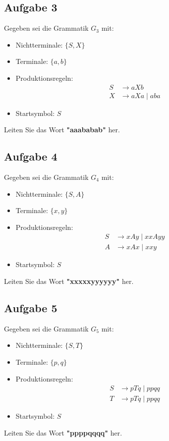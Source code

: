 \documentclass[a4paper,12pt]{article}
\begin{document}
	\subsection*{Aufgabe 3}
	Gegeben sei die Grammatik $G_3$ mit:
	\begin{itemize}
		\item Nichtterminale: $\{S, X\}$
		\item Terminale: $\{a, b\}$
		\item Produktionsregeln:
		\begin{align*}
			S &\rightarrow a X b \\
			X &\rightarrow a X a \mid a b a
		\end{align*}
		\item Startsymbol: $S$
	\end{itemize}
	Leiten Sie das Wort \textbf{"aaababab"} her.
	
	\subsection*{Aufgabe 4}
	Gegeben sei die Grammatik $G_4$ mit:
	\begin{itemize}
		\item Nichtterminale: $\{S, A\}$
		\item Terminale: $\{x, y\}$
		\item Produktionsregeln:
		\begin{align*}
			S &\rightarrow x A y \mid x x A y y \\
			A &\rightarrow x A x \mid x x y
		\end{align*}
		\item Startsymbol: $S$
	\end{itemize}
	Leiten Sie das Wort \textbf{"xxxxxyyyyyy"} her.
	
	\subsection*{Aufgabe 5}
	Gegeben sei die Grammatik $G_5$ mit:
	\begin{itemize}
		\item Nichtterminale: $\{S, T\}$
		\item Terminale: $\{p, q\}$
		\item Produktionsregeln:
		\begin{align*}
			S &\rightarrow p T q \mid p p q q \\
			T &\rightarrow p T q \mid p p q q
		\end{align*}
		\item Startsymbol: $S$
	\end{itemize}
	Leiten Sie das Wort \textbf{"ppppqqqq"} her.
	
\end{document}
